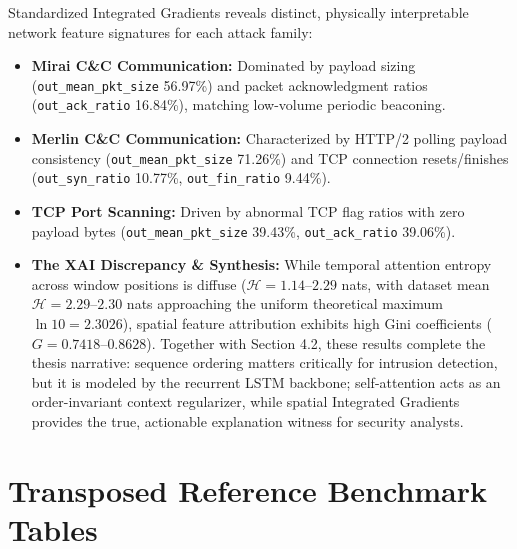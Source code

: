 \documentclass[10pt,a4paper]{article}
\begin{document}
\noindent Standardized Integrated Gradients reveals distinct, physically interpretable network feature signatures for each attack family:
\begin{itemize}[leftmargin=*]
    \item \textbf{Mirai C\&C Communication:} Dominated by payload sizing (\texttt{out\_mean\_pkt\_size} 56.97\%) and packet acknowledgment ratios (\texttt{out\_ack\_ratio} 16.84\%), matching low-volume periodic beaconing.
    \item \textbf{Merlin C\&C Communication:} Characterized by HTTP/2 polling payload consistency (\texttt{out\_mean\_pkt\_size} 71.26\%) and TCP connection resets/finishes (\texttt{out\_syn\_ratio} 10.77\%, \texttt{out\_fin\_ratio} 9.44\%).
    \item \textbf{TCP Port Scanning:} Driven by abnormal TCP flag ratios with zero payload bytes (\texttt{out\_mean\_pkt\_size} 39.43\%, \texttt{out\_ack\_ratio} 39.06\%).
    \item \textbf{The XAI Discrepancy \& Synthesis:} While temporal attention entropy across window positions is diffuse ($\mathcal{H} = 1.14\text{--}2.29$ nats, with dataset mean $\mathcal{H} = 2.29\text{--}2.30$ nats approaching the uniform theoretical maximum $\ln 10 = 2.3026$), spatial feature attribution exhibits high Gini coefficients ($G = 0.7418\text{--}0.8628$). Together with Section 4.2, these results complete the thesis narrative: sequence ordering matters critically for intrusion detection, but it is modeled by the recurrent LSTM backbone; self-attention acts as an order-invariant context regularizer, while spatial Integrated Gradients provides the true, actionable explanation witness for security analysts.
\end{itemize}

\section{Transposed Reference Benchmark Tables}
\end{document}
